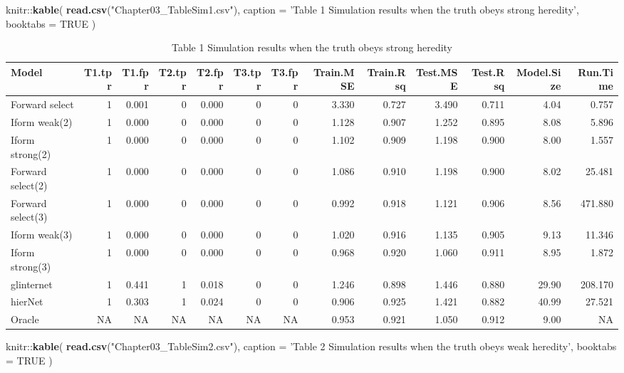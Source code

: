 \documentclass[11pt,]{book}
\newenvironment{Shaded}{\begin{snugshade}}{\end{snugshade}}
\newcommand{\KeywordTok}[1]{\textcolor[rgb]{0.13,0.29,0.53}{\textbf{{#1}}}}
\newcommand{\DataTypeTok}[1]{\textcolor[rgb]{0.13,0.29,0.53}{{#1}}}
\newcommand{\StringTok}[1]{\textcolor[rgb]{0.31,0.60,0.02}{{#1}}}
\newcommand{\OtherTok}[1]{\textcolor[rgb]{0.56,0.35,0.01}{{#1}}}
\newcommand{\NormalTok}[1]{{#1}}
\theoremstyle{definition}
\theoremstyle{definition}
\theoremstyle{remark}
\begin{document}
\begin{Shaded}
\begin{Highlighting}[]
\NormalTok{knitr::}\KeywordTok{kable}\NormalTok{(}
  \KeywordTok{read.csv}\NormalTok{(}\StringTok{"Chapter03_TableSim1.csv"}\NormalTok{), }\DataTypeTok{caption =} \StringTok{'Table 1 Simulation results when the truth obeys strong heredity'}\NormalTok{,}
  \DataTypeTok{booktabs =} \OtherTok{TRUE}
\NormalTok{)}
\end{Highlighting}
\end{Shaded}

\begin{table}

\caption{\label{tab:Chap3sim1}Table 1 Simulation results when the truth obeys strong heredity}
\centering
\begin{tabular}[t]{lrrrrrrrrrrrr}
\toprule
Model & T1.tpr & T1.fpr & T2.tpr & T2.fpr & T3.tpr & T3.fpr & Train.MSE & Train.Rsq & Test.MSE & Test.Rsq & Model.Size & Run.Time\\
\midrule
Forward select & 1 & 0.001 & 0 & 0.000 & 0 & 0 & 3.330 & 0.727 & 3.490 & 0.711 & 4.04 & 0.757\\
Iform weak(2) & 1 & 0.000 & 0 & 0.000 & 0 & 0 & 1.128 & 0.907 & 1.252 & 0.895 & 8.08 & 5.896\\
Iform strong(2) & 1 & 0.000 & 0 & 0.000 & 0 & 0 & 1.102 & 0.909 & 1.198 & 0.900 & 8.00 & 1.557\\
Forward select(2) & 1 & 0.000 & 0 & 0.000 & 0 & 0 & 1.086 & 0.910 & 1.198 & 0.900 & 8.02 & 25.481\\
Forward select(3) & 1 & 0.000 & 0 & 0.000 & 0 & 0 & 0.992 & 0.918 & 1.121 & 0.906 & 8.56 & 471.880\\
\addlinespace
Iform weak(3) & 1 & 0.000 & 0 & 0.000 & 0 & 0 & 1.020 & 0.916 & 1.135 & 0.905 & 9.13 & 11.346\\
Iform strong(3) & 1 & 0.000 & 0 & 0.000 & 0 & 0 & 0.968 & 0.920 & 1.060 & 0.911 & 8.95 & 1.872\\
glinternet & 1 & 0.441 & 1 & 0.018 & 0 & 0 & 1.246 & 0.898 & 1.446 & 0.880 & 29.90 & 208.170\\
hierNet & 1 & 0.303 & 1 & 0.024 & 0 & 0 & 0.906 & 0.925 & 1.421 & 0.882 & 40.99 & 27.521\\
Oracle & NA & NA & NA & NA & NA & NA & 0.953 & 0.921 & 1.050 & 0.912 & 9.00 & NA\\
\bottomrule
\end{tabular}
\end{table}

\begin{Shaded}
\begin{Highlighting}[]
\NormalTok{knitr::}\KeywordTok{kable}\NormalTok{(}
  \KeywordTok{read.csv}\NormalTok{(}\StringTok{"Chapter03_TableSim2.csv"}\NormalTok{), }\DataTypeTok{caption =} \StringTok{'Table 2 Simulation results when the truth obeys weak heredity'}\NormalTok{,}
  \DataTypeTok{booktabs =} \OtherTok{TRUE}
\NormalTok{)}
\end{Highlighting}
\end{Shaded}
\end{document}
